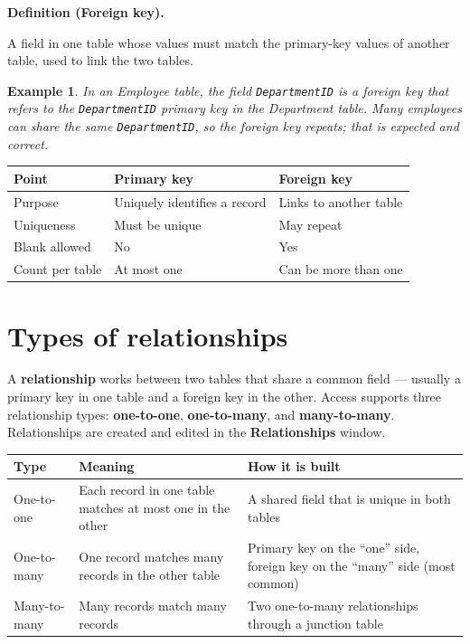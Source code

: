 \documentclass[11pt]{article}
\newtheorem{example}{Example}[section]
\newenvironment{definitionbox}[1]{%
  \par\noindent\textbf{Definition (#1).}\ \itshape
}{\par\vspace{0.3em}}
\begin{document}
\begin{definitionbox}{Foreign key}
A field in one table whose values must match the primary-key values of another
table, used to link the two tables.
\end{definitionbox}

\begin{example}
In an Employee table, the field \texttt{DepartmentID} is a foreign key that
refers to the \texttt{DepartmentID} primary key in the Department table. Many
employees can share the same \texttt{DepartmentID}, so the foreign key repeats;
that is expected and correct.
\end{example}

\begin{center}
\begin{tabular}{p{}p{}p{}}
\toprule
\textbf{Point} & \textbf{Primary key} & \textbf{Foreign key} \\
\midrule
Purpose & Uniquely identifies a record & Links to another table \\
Uniqueness & Must be unique & May repeat \\
Blank allowed & No & Yes \\
Count per table & At most one & Can be more than one \\
\bottomrule
\end{tabular}
\end{center}

\section{Types of relationships}
A \textbf{relationship} works between two tables that share a common field ---
usually a primary key in one table and a foreign key in the other. Access
supports three relationship types: \textbf{one-to-one},
\textbf{one-to-many}, and \textbf{many-to-many}. Relationships are created and
edited in the \textbf{Relationships} window.

\begin{center}
\begin{tabular}{p{}p{}p{}}
\toprule
\textbf{Type} & \textbf{Meaning} & \textbf{How it is built} \\
\midrule
One-to-one & Each record in one table matches at most one in the other & A shared field that is unique in both tables \\
One-to-many & One record matches many records in the other table & Primary key on the ``one'' side, foreign key on the ``many'' side (most common) \\
Many-to-many & Many records match many records & Two one-to-many relationships through a junction table \\
\bottomrule
\end{tabular}
\end{center}
\end{document}
